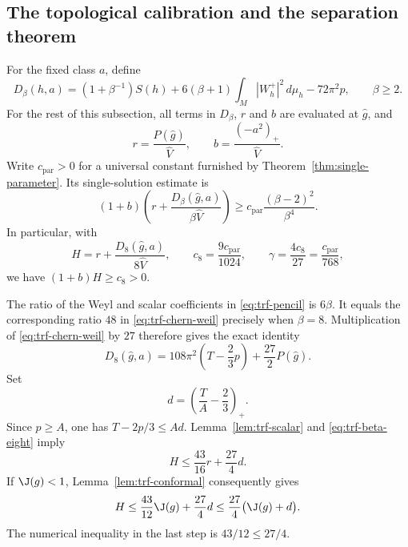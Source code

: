 \subsection{The topological calibration and the separation theorem}

For the fixed class $a$, define
\begin{equation}
 D_\beta(h,a)=
 (1+\beta^{-1})S(h)+6(\beta+1)\int_M|W_h^+|^2\,d\mu_h
 -72\pi^2p,
 \qquad \beta\ge2.
 \label{eq:trf-pencil}
\end{equation}
For the rest of this subsection, all terms in $D_\beta$, $r$ and $b$
are evaluated at $\widehat g$, and
\[
 r=\frac{P(\widehat g)}{\widehat V},\qquad
 b=\frac{(-a^2)_+}{\widehat V}.
\]
Write $c_{\mathrm{par}}>0$ for a universal constant furnished by
Theorem~\ref{thm:single-parameter}.  Its single-solution estimate is
\begin{equation}
 (1+b)\left(r+\frac{D_\beta(\widehat g,a)}{\beta\widehat V}\right)
 \ge c_{\mathrm{par}}\frac{(\beta-2)^2}{\beta^4}.
 \label{eq:trf-parameter}
\end{equation}
In particular, with
\begin{equation}
 H=r+\frac{D_8(\widehat g,a)}{8\widehat V},\qquad
 c_8=\frac{9c_{\mathrm{par}}}{1024},\qquad
 \gamma=\frac{4c_8}{27}=\frac{c_{\mathrm{par}}}{768},
 \label{eq:trf-constants}
\end{equation}
we have $(1+b)H\ge c_8>0$.

The ratio of the Weyl and scalar coefficients in
\eqref{eq:trf-pencil} is $6\beta$.  It equals the corresponding ratio
$48$ in \eqref{eq:trf-chern-weil} precisely when $\beta=8$.
Multiplication of \eqref{eq:trf-chern-weil} by $27$ therefore gives
the exact identity
\begin{equation}
 D_8(\widehat g,a)
 =108\pi^2\left(T-\frac23p\right)+\frac{27}{2}P(\widehat g).
 \label{eq:trf-beta-eight}
\end{equation}
Set
\begin{equation}
 d=\left(\frac{T}{A}-\frac23\right)_+.
 \label{eq:trf-topological-excess}
\end{equation}
Since $p\ge A$, one has $T-2p/3\le Ad$.  Lemma~\ref{lem:trf-scalar}
and \eqref{eq:trf-beta-eight} imply
\begin{equation}
 H\le\frac{43}{16}r+\frac{27}{4}d.
 \label{eq:trf-H-upper}
\end{equation}
If $\J(g)<1$, Lemma~\ref{lem:trf-conformal} consequently gives
\begin{equation}
 H\le\frac{43}{12}\J(g)+\frac{27}{4}d
       \le\frac{27}{4}\bigl(\J(g)+d\bigr).
 \label{eq:trf-H-J}
\end{equation}
The numerical inequality in the last step is $43/12\le27/4$.

